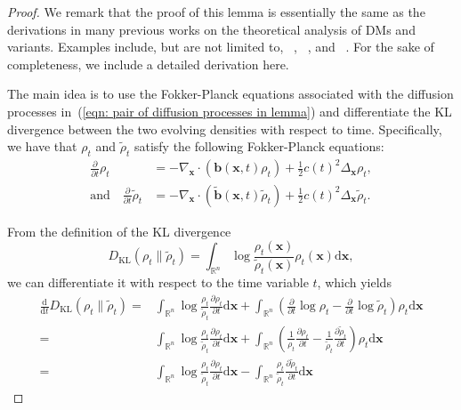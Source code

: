 \documentclass{article}
\numberwithin{equation}{section}
\def\eqref#1{(\ref{#1})}
\newcommand{\dif}{{\mathrm{d}}}
\def\vb{{\bm{b}}}
\def\vx{{\bm{x}}}
\newcommand{\KL}{D_{\mathrm{KL}}}
\begin{document}
\begin{proof}
    We remark that the proof of this lemma is essentially the same as the derivations in many previous works on the theoretical analysis of DMs and variants. Examples include, but are not limited to, ~\cite[Lemma C.1]{chen2023improved}, ~\cite[Lemma 2.22]{albergo2023stochastic}, and ~\cite[Lemma A.4]{wu2024principled}. For the sake of completeness, we include a detailed derivation here. 

    The main idea is to use the Fokker-Planck equations associated with the diffusion processes in~\eqref{eqn: pair of diffusion processes in lemma} and differentiate the KL divergence between the two evolving densities with respect to time. Specifically, we have that $\rho_t$ and $\widetilde{\rho}_t$ satisfy the following Fokker-Planck equations:
    \begin{equation}
    \label{eqn: pair of FKP equations in lemma}
    \begin{aligned}
    \frac{\partial}{\partial t}\rho_t &= -\nabla_{\vx} \cdot \left(\vb(\vx,t)\rho_t\right) + \frac{1}{2}c(t)^2\Delta_{\vx}\rho_t,\\
    \text{and}\quad \frac{\partial}{\partial t}\widetilde{\rho}_t &= -\nabla_{\vx} \cdot \left(\widetilde{\vb}(\vx,t)\widetilde{\rho}_t\right) + \frac{1}{2}c(t)^2\Delta_{\vx}\widetilde{\rho}_t.
    \end{aligned}    
    \end{equation}

    From the definition of the KL divergence 
    $$
        \KL(\rho_t \| \widetilde{\rho}_t) = \int_{\mathbb{R}^n}\log\frac{\rho_t(\vx)}{\widetilde{\rho}_t(\vx)}\rho_t(\vx)\dif\vx,
    $$ 
    we can differentiate it with respect to the time variable $t$, which yields 
    \begin{equation}
    \label{eqn: time derivative of KL in lemma}
    \begin{aligned}
    \frac{\dif}{\dif t}\KL(\rho_t \| \widetilde{\rho}_t) = &\int_{\mathbb{R}^n}\log\frac{\rho_t}{\widetilde{\rho}_t}\frac{\partial \rho_t}{\partial t}\dif\vx + \int_{\mathbb{R}^n}\left(\frac{\partial}{\partial t}\log\rho_t - \frac{\partial}{\partial t}\log\widetilde{\rho}_t\right)\rho_t\dif\vx\\
    = &\int_{\mathbb{R}^n}\log\frac{\rho_t}{\widetilde{\rho}_t}\frac{\partial \rho_t}{\partial t}\dif\vx + \int_{\mathbb{R}^n}\left(\frac{1}{\rho_t}\frac{\partial \rho_t}{\partial t} - \frac{1}{\widetilde{\rho}_t}\frac{\partial \widetilde{\rho}_t}{\partial t}\right)\rho_t\dif\vx\\
    = &\int_{\mathbb{R}^n}\log\frac{\rho_t}{\widetilde{\rho}_t}\frac{\partial \rho_t}{\partial t}\dif\vx - \int_{\mathbb{R}^n}\frac{\rho_t}{\widetilde{\rho}_t}\frac{\partial \widetilde\rho_t}{\partial t}\dif\vx
    \end{aligned}    
    \end{equation}


\end{proof}
\end{document}
